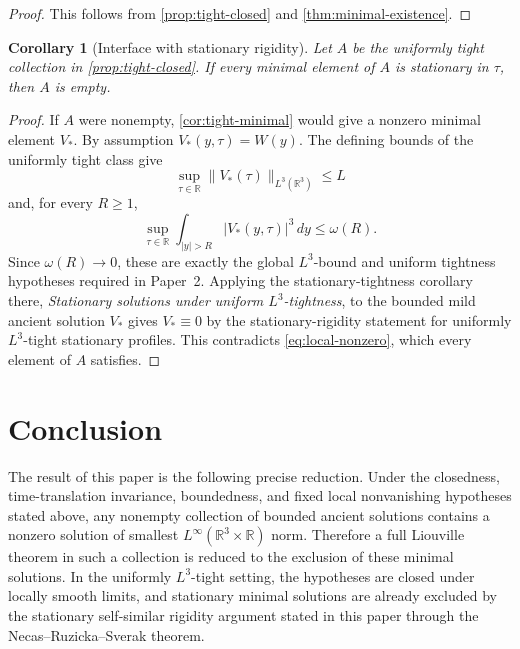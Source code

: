 \documentclass[11pt]{amsart}
\theoremstyle{plain}
\newtheorem{corollary}[theorem]{Corollary}
\theoremstyle{definition}
\theoremstyle{remark}
\numberwithin{equation}{section}
\begin{document}
\begin{proof}
This follows from \cref{prop:tight-closed} and
\cref{thm:minimal-existence}.
\end{proof}

\begin{corollary}[Interface with stationary rigidity]\label{cor:stationary-interface}
Let \(A\) be the uniformly tight collection in \cref{prop:tight-closed}.  If
every minimal element of \(A\) is stationary in \(\tau\), then \(A\) is empty.
\end{corollary}

\begin{proof}
If \(A\) were nonempty, \cref{cor:tight-minimal} would give a nonzero minimal
element \(V_*\).  By assumption \(V_*(y,\tau)=W(y)\).  The defining bounds of
the uniformly tight class give
\[
   \sup_{\tau\in\mathbb R}\|V_*(\tau)\|_{L^3(\mathbb R^3)}\le L
\]
and, for every \(R\ge1\),
\[
   \sup_{\tau\in\mathbb R}
   \int_{|y|>R}|V_*(y,\tau)|^3\,dy\le\omega(R).
\]
Since \(\omega(R)\to0\), these are exactly the global \(L^3\)-bound and
uniform tightness hypotheses required in Paper~2.  Applying the
stationary-tightness corollary there, \emph{Stationary solutions under uniform
\(L^3\)-tightness}, to the bounded mild ancient solution \(V_*\) gives
\(V_*\equiv0\)
  by the stationary-rigidity statement for uniformly \(L^3\)-tight stationary
  profiles.  This contradicts \eqref{eq:local-nonzero},
which every element of \(A\) satisfies.
\end{proof}

\section{Conclusion}

The result of this paper is the following precise reduction.  Under the
closedness, time-translation invariance, boundedness, and fixed local
nonvanishing hypotheses stated above, any nonempty collection of bounded
ancient solutions contains a nonzero solution of smallest
\(L^\infty(\mathbb R^3\times\mathbb R)\) norm.  Therefore a full Liouville
theorem in such a collection is reduced to the exclusion of these minimal
solutions.  In the uniformly \(L^3\)-tight setting, the hypotheses are closed
under locally smooth limits, and stationary minimal solutions are already
excluded by the stationary self-similar rigidity argument stated in this
paper through the Necas--Ruzicka--Sverak theorem.
\end{document}
